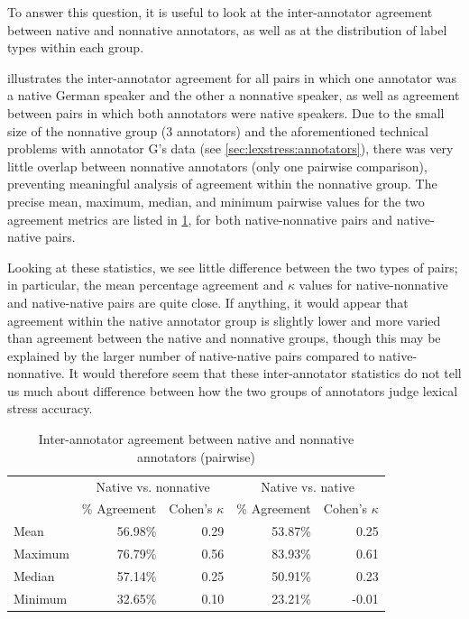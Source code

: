 		To answer this question, it is useful to look at the inter-annotator agreement between native and nonnative annotators, as well as at the distribution of label types within each group. 
		
		 illustrates the inter-annotator agreement for all pairs in which one annotator was a native German speaker and the other a nonnative speaker, as well as agreement between pairs in which both annotators were native speakers. Due to the small size of the nonnative group (3 annotators) and the aforementioned technical problems with annotator G's data (see \cref{sec:lexstress:annotators}), there was very little overlap between nonnative annotators (only one pairwise comparison), preventing meaningful analysis of agreement within the nonnative group. The precise mean, maximum, median, and minimum pairwise values for the two agreement metrics are listed in \cref{tab:agreement:L1}, for both  native-nonnative pairs and native-native pairs. 
		
		Looking at these statistics, we see little difference between the two types of pairs; in particular, the mean percentage agreement and $\kappa$ values for native-nonnative and native-native pairs are quite close. If anything, it would appear that agreement within the native annotator group is slightly lower and more varied than agreement between the native and nonnative groups, though this may be explained by the larger number of native-native pairs compared to native-nonnative. It would therefore seem that these inter-annotator statistics do not tell us much about difference between how the two groups of annotators judge lexical stress accuracy.
		
		
		\begin{table}[tb]
			\centering
			\caption{Inter-annotator agreement between native and nonnative annotators (pairwise)}
			\begin{tabular}{lrrrr}
			\toprule
			& \multicolumn{2}{c}{Native vs. nonnative} & \multicolumn{2}{c}{Native vs. native} \\
			\cmidrule(lr){2-3} \cmidrule(lr){4-5}
			& \% Agreement & Cohen's $\kappa$ & \% Agreement & Cohen's $\kappa$  \\
			\midrule
Mean	&56.98\%	 & 0.29  & 53.87\%	& 0.25\\
Maximum&	76.79\%	& 0.56 & 83.93\%	 & 0.61\\
Median	& 57.14\%	 &0.25 &  50.91\%	& 0.23 \\
Minimum	&32.65\%	 & 0.10 &  23.21\% &	-0.01\\
			\bottomrule
			\end{tabular}
			\label{tab:agreement:L1}
		\end{table} 
		
